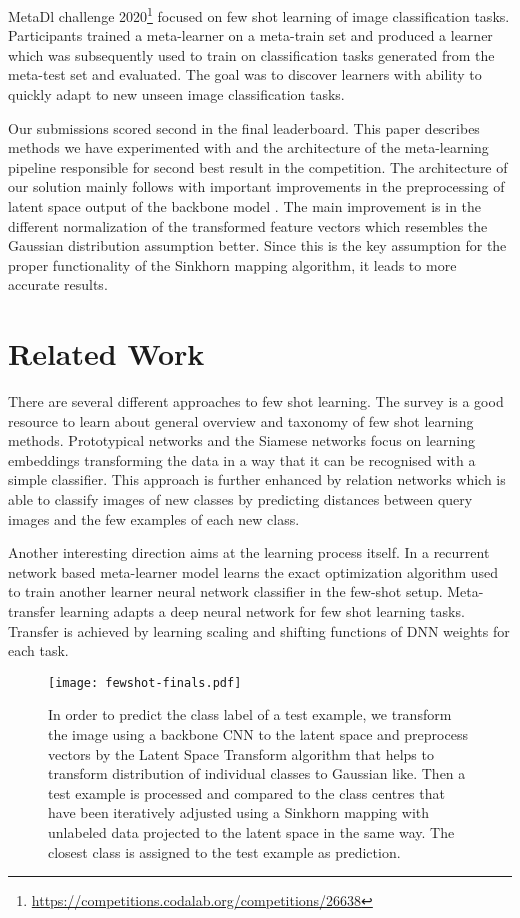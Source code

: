 \documentclass[letterpaper]{article} \usepackage{aaai20}  \usepackage{times}  \usepackage{helvet} \usepackage{courier}  \usepackage[hyphens]{url}  \usepackage{graphicx} \urlstyle{rm} \def\UrlFont{\rm}  \usepackage{graphicx}  \frenchspacing  \setlength{\pdfpagewidth}{8.5in}  \setlength{\pdfpageheight}{11in}  \usepackage[ruled,vlined]{algorithm2e}
\begin{document}
MetaDl challenge 2020\footnote{\url{https://competitions.codalab.org/competitions/26638}} focused on few shot learning of image classification tasks. Participants trained a meta-learner on a meta-train set and produced a learner which was subsequently used to train on classification tasks generated from the meta-test set and evaluated. The goal was to discover learners with ability to quickly adapt to new unseen image classification tasks. 

Our submissions scored second in the final leaderboard. This paper describes methods we have experimented with and the architecture of the meta-learning pipeline responsible for second best result in the competition.
The architecture of our solution mainly follows \cite{hu2020leveraging} with important improvements in the preprocessing of latent space output of the backbone model . The main improvement is in the different normalization of the transformed feature vectors which resembles the Gaussian distribution assumption better. 
Since this is the key assumption for the proper functionality of the Sinkhorn mapping algorithm, it leads to more accurate results.

\section{Related Work}
There are several different approaches to few shot learning. The survey \cite{wang2020generalizing} is a good resource to learn about general overview and taxonomy of few shot learning methods. 
Prototypical networks \cite{snell2017prototypical} and the Siamese networks \cite{koch2015siamese} focus on learning embeddings transforming the data in a way that it can be recognised with a simple classifier. This approach is further enhanced by relation networks \cite{sung2018learning} which is able to classify images of new classes by predicting distances between query images and the few examples of each new class.

Another interesting direction aims at the learning process itself. In \cite{DBLP:conf/iclr/RaviL17} a recurrent network based meta-learner model learns the exact optimization algorithm used to train
another learner neural network classifier in the few-shot setup. Meta-transfer learning \cite{sun2019meta} adapts a deep neural network for few shot learning tasks. Transfer is achieved by learning scaling and shifting functions of DNN weights for each task.

\begin{figure*}[h]
  \texttt{[image: fewshot-finals.pdf]}
  \caption{In order to predict the class label of a test example, we transform the image using a backbone CNN to the latent space and preprocess vectors by the Latent Space Transform algorithm that helps to transform distribution of individual classes to Gaussian like. Then a test example is processed and compared to the class centres that have been iteratively adjusted using a Sinkhorn mapping with unlabeled data projected to the latent space in the same way. The closest class is assigned to the test example as prediction.}
  \label{fig:diagram}
\end{figure*}
\end{document}
